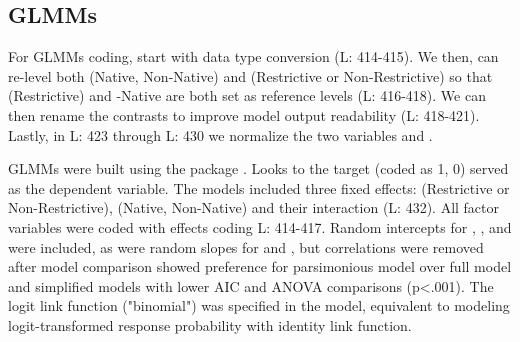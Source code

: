 \subsection{GLMMs}

For GLMMs coding, start with data type conversion (L: 414-415). We then, can re-level both (Native, Non-Native) and (Restrictive or Non-Restrictive) so that (Restrictive) and -Native are both set as reference levels (L: 416-418).  We can then rename the contrasts to improve model output readability (L: 418-421). Lastly, in L: 423 through L: 430 we normalize the two variables  and .



GLMMs were built using the  package \parencite{Bates2014-eq}. Looks to the target (coded as 1, 0) served as the dependent variable. The models included three fixed effects:  (Restrictive or Non-Restrictive), (Native, Non-Native) and their interaction (L: 432). All factor variables were coded with
effects coding L: 414-417. Random intercepts for , , and
 were included, as were random slopes for  and , but correlations were removed after model comparison showed preference for parsimonious model over full model and simplified models with lower AIC and ANOVA comparisons (p<.001). The logit link function ("binomial") was specified in the model, equivalent to modeling logit-transformed response probability with identity link function. 




